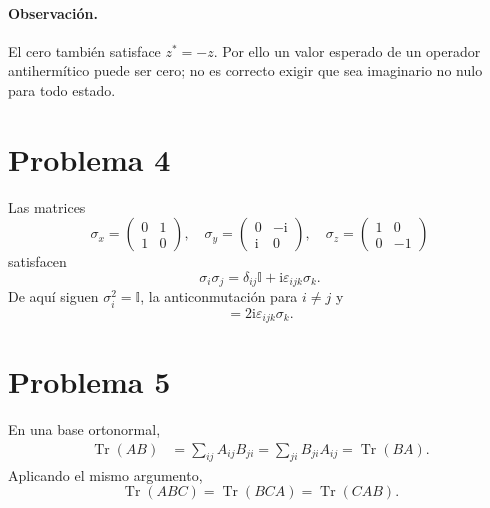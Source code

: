\documentclass[11pt,a4paper]{article}
\numberwithin{equation}{section}
\renewcommand{\boxed}[1]{#1}
\newcommand{\ii}{\mathrm i}
\newcommand{\id}{\mathbb I}
\begin{document}
\paragraph{Observación.}
El cero también satisface $z^*=-z$. Por ello un valor esperado de un operador antihermítico puede ser cero; no es correcto exigir que sea imaginario no nulo para todo estado.


\section{Problema 4}
Las matrices
\begin{equation}
\sigma_x=\begin{pmatrix}0&1\\1&0\end{pmatrix},\quad
\sigma_y=\begin{pmatrix}0&-\ii\\\ii&0\end{pmatrix},\quad
\sigma_z=\begin{pmatrix}1&0\\0&-1\end{pmatrix}
\end{equation}
satisfacen
\begin{equation}
\sigma_i\sigma_j=\delta_{ij}\id+\ii\varepsilon_{ijk}\sigma_k.
\end{equation}
De aquí siguen $\sigma_i^2=\id$, la anticonmutación para $i\neq j$ y
\begin{equation}
[\sigma_i,\sigma_j]=2\ii\varepsilon_{ijk}\sigma_k.
\end{equation}

\section{Problema 5}
En una base ortonormal,
\begin{align}
\operatorname{Tr}(AB)&=\sum_{ij}A_{ij}B_{ji}
=\sum_{ji}B_{ji}A_{ij}=\operatorname{Tr}(BA).
\end{align}
Aplicando el mismo argumento,
\begin{equation}
\boxed{\operatorname{Tr}(ABC)=\operatorname{Tr}(BCA)=\operatorname{Tr}(CAB).}
\end{equation}
\end{document}
